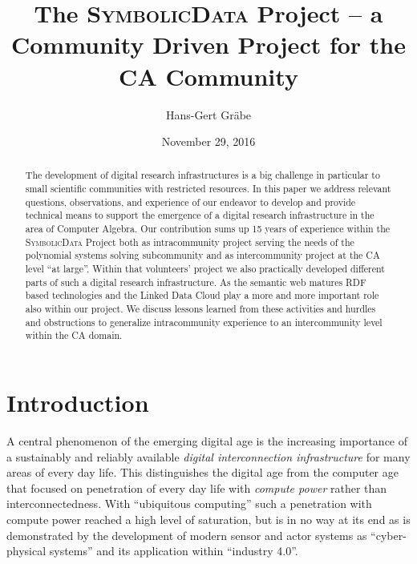 \documentclass{mathincs}
\newcommand{\SD}{\textsc{Symbo\-lic\-Data}}
\begin{document}
\title[The \textsc{SymbolicData} Project]{The \textsc{SymbolicData} Project --
  a Community Driven Project for the CA Community}

\author[Hans-Gert Gr\"abe]{Hans-Gert Gr\"abe}
\address{Computer Science Department\\ Leipzig
  University\\ Augustusplatz~10\\ D~04109 Leipzig\\ Germany} 


\date{November 29, 2016}

\begin{abstract}
  The development of digital research infrastructures is a big challenge in
  particular to small scientific communities with restricted resources.  In
  this paper we address relevant questions, observations, and experience of our
  endeavor to develop and provide technical means to support the emergence of a
  digital research infrastructure in the area of Computer Algebra.  Our
  contribution sums up 15 years of experience within the {\SD} Project both as
  intracommunity project serving the needs of the polynomial systems solving
  subcommunity and as intercommunity project at the CA level ``at large''.
  Within that volunteers' project we also practically developed different parts
  of such a digital research infrastructure.  As the semantic web matures RDF
  based technologies and the Linked Data Cloud play a more and more important
  role also within our project.  We discuss lessons learned from these
  activities and hurdles and obstructions to generalize intracommunity
  experience to an intercommunity level within the CA domain.
\end{abstract}

\maketitle

\section{Introduction}

A central phenomenon of the emerging digital age is the increasing importance
of a sustainably and reliably available \emph{digital interconnection
  infrastructure} for many areas of every day life. This distinguishes the
digital age from the computer age that focused on penetration of every day
life with \emph{compute power} rather than interconnectedness.  With
``ubiquitous computing'' such a penetration with compute power reached a high
level of saturation, but is in no way at its end as is demonstrated by the
development of modern sensor and actor systems as ``cyber-physical systems''
and its application within ``industry 4.0''. 
\end{document}
